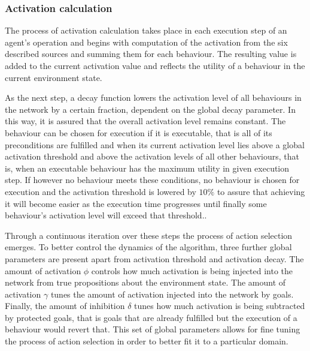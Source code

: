 \subsubsection{Activation calculation}
The process of activation calculation takes place in each execution step of an agent's operation and begins with computation of the activation from the six described sources and summing them for each behaviour. The resulting value is added to the current activation value and reflects the utility of a behaviour in the current environment state.\par
As the next step, a decay function lowers the activation level of all behaviours in the network by a certain fraction, dependent on the global decay parameter. In this way, it is assured that the overall activation level remains constant. The behaviour can be chosen for execution if it is executable, that is all of its preconditions are fulfilled and when its current activation level lies above a global activation threshold and above the activation levels of all other behaviours, that is, when an executable behaviour has the maximum utility in given execution step. If however no behaviour meets these conditions, no behaviour is chosen for execution and the activation threshold is lowered by $10\%$ to assure that achieving it will become easier as the execution time progresses until finally some behaviour's activation level will exceed that threshold.\cite{maes}.\par
Through a continuous iteration over these steps the process of action selection emerges. To better control the dynamics of the algorithm, three further global parameters are present apart from activation threshold and activation decay. The amount of activation $\phi$ controls how much activation is being injected into the network from true propositions about the environment state. The amount of activation $\gamma$ tunes the amount of activation injected into the network by goals. Finally, the amount of inhibition $\delta$ tunes how much activation is being subtracted by protected goals, that is goals that are already fulfilled but the execution of a behaviour would revert that. This set of global parameters allows for fine tuning the process of action selection in order to better fit it to a particular domain.
